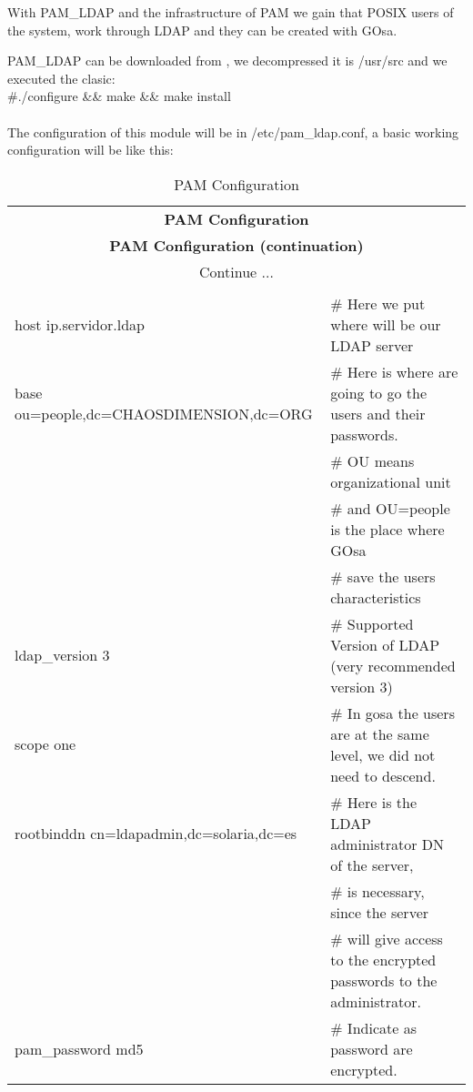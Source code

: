 With PAM\_LDAP and the infrastructure of PAM we gain that POSIX users of the system, work through LDAP and they can be created with GOsa.

PAM\_LDAP can be downloaded from , we decompressed it is /usr/src and we executed the clasic: \\

\#./configure \&\& make \&\& make install\\
\\
The configuration of this module will be in /etc/pam\_ldap.conf, a basic working configuration will be like this:
\begin{center}
\begin{longtable}{|ll|}\hline
\caption{PAM Configuration}\\
\hline \hline
\multicolumn{2}{|c|}{\textbf{PAM Configuration}}\\
\hline \hline
\endfirsthead
\hline \hline
\multicolumn{2}{|c|}{\textbf{PAM Configuration (continuation)}}\\
\hline \hline
\endhead
\hline
\multicolumn{2}{|c|}{Continue $\ldots$}\\
\hline
\endfoot
\hline
\multicolumn{2}{|c|}{\textbf{End}}\\
\hline
\endlastfoot
host ip.servidor.ldap & \# Here we put where will be our LDAP server\\
base ou=people,dc=CHAOSDIMENSION,dc=ORG & \# Here is where are going to go the users and their passwords.\\
 & \# OU means organizational unit\\
 & \# and OU=people is the place where GOsa\\
 & \# save the users characteristics\\
ldap\_version 3 & \# Supported Version of LDAP (very recommended version 3)\\
scope one & \# In gosa the users are at the same level, we did not need to descend.\\
rootbinddn cn=ldapadmin,dc=solaria,dc=es & \# Here is the LDAP administrator DN of the server,\\
 & \# is necessary, since the server\\
 & \# will give access to the encrypted passwords to the administrator.\\
pam\_password md5 & \# Indicate as password are encrypted.\\
\end{longtable}
\end{center}


